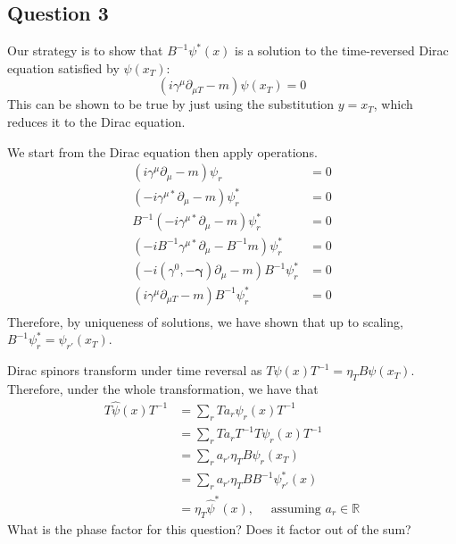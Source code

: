 \documentclass[11pt, oneside]{article}   	%
\theoremstyle{slanted}
\begin{document}
\subsection*{Question 3}
Our strategy is to show that $ B ^{  -1 } \psi ^ * \left(  x  \right)  $ 
is a solution to the time-reversed Dirac equation 
satisfied by $ \psi \left(  x _ T  \right)  $: 
\[
	\left( i \gamma ^ \mu \partial  _{ \mu T }  - m  \right)  \psi \left( x _T  \right)  =
	 0 
\] This can be shown to 
be true by just using the substitution $ y  = x _ T $, 
which reduces it to the Dirac equation. 

We start from the Dirac equation then 
apply operations. 
\begin{align*}
	\left( i \gamma ^ \mu \partial  _ \mu  - m  \right)  \psi _ r  &=  0  \\ 
	\left(   - i \gamma ^{ \mu * } \partial  _ \mu  - m  \right) \psi _ r ^ * &=  0  \\ 
	B ^{ - 1} \left(  - i \gamma ^{ \mu * } \partial  _ \mu  - m  \right)  \psi _ r ^ *  &  = 0  \\ 
	\left(  -i B ^{  -1 } \gamma ^{ \mu * } \partial  _ \mu  - B  ^{ - 1 } m    \right)  
	\psi _ r ^ *  &=  0  \\ 
	\left(  - i \left( \gamma^ 0 ,  - \mathbf{\gamma}  \right) \partial  _ \mu 
- m \right) B ^{ - 1 } \psi ^ * _ r  & = 0 \\ 
  \left( i \gamma ^ \mu \partial _{ \mu T }  - m  \right)  B ^{ - 1 } \psi ^ * _ r  &=  0  \\
\end{align*}
Therefore, by uniqueness of solutions, 
we have shown that up to scaling, $ B ^{  -1 } \psi ^{ * } _ r  = \psi_{ r  ' } 
\left( x  _ T  \right)  $. 

Dirac spinors 
transform under time reversal as $ T \psi \left( x  \right)  T ^{  -1 } 
 = \eta _ T  B \psi \left( x _ T  \right)  $. 
 Therefore, under the whole transformation, 
 we have that 
 \begin{align*}
	 T \hat{ \psi } \left( x  \right)  T^{ -1 } 
	 &=  \sum _ r T a _ r \psi _ r \left(  x  \right)  T ^{ - 1 }  \\ 
	 &=  \sum _ r T a _ r T ^{ - 1 } T \psi _ r \left( x  \right)  T ^{ - 1 }  \\ 
	 &=  \sum _ r a _{ r ' } \eta _ T B \psi _r \left( x _ T   \right)  \\
	 &=  \sum _ r a _{ r ' } \eta _ T B B^{ - 1 } \psi _{ r  ' } ^ * \left(  x  \right)  \\
	 &=  \eta _ T \hat{ \psi }^ *  \left( x  \right)   , \quad 
	 \text{ assuming } a_ r \in \mathbb{ R }
 \end{align*}
 What is the phase factor 
 for this question? Does it factor out of the sum?
\end{document}
